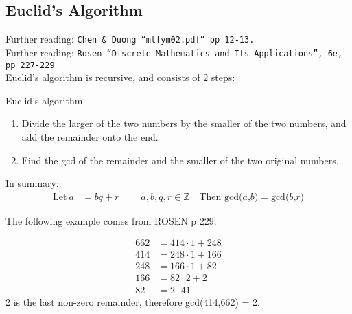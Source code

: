 \subsection{Euclid's Algorithm}
\label{sec:P Euclid's Algortihm}
Further reading: \texttt{Chen \& Duong ``mtfym02.pdf'' pp 12-13.}\\
Further reading: \texttt{Rosen ``Discrete Mathematics and Its Applications'', 6e, pp 227-229}\\[0.5cm]

Euclid's algorithm is recursive, and consists of $2$ steps:
\begin{remember}{Euclid's algorithm}{
\begin{enumerate}
  \item Divide the larger of the two numbers by the smaller of the two numbers,
  and add the remainder onto the end.
  \item Find the gcd of the remainder and the smaller of the two original numbers.
\end{enumerate}

In summary:
\begin{align}
  \text{Let} ~ a &= bq + r \quad | \quad a,b,q,r \in \mathbb{Z} \quad \text{Then gcd($a$,$b$)} = \text{gcd($b$,$r$)}
\end{align}
}
\end{remember}

The following example comes from ROSEN p 229:

\begin{align}
  662 &= 414 \cdot 1 + 248 \\
  414 &= 248 \cdot 1 + 166 \\
  248 &= 166 \cdot 1 + 82 \\
  166 &= 82 \cdot 2 + 2 \\
  82 &= 2 \cdot 41
\end{align}
2 is the last non-zero remainder, therefore gcd(414,662) = 2.